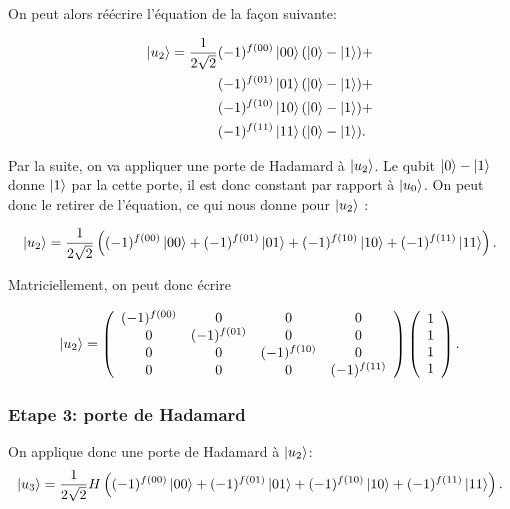 On peut alors réécrire l'équation de la façon suivante: 



\begin{align*}
  \ket{u_2} = \frac{1}{2\sqrt{2}} & (-1)^{f(00)} \ket{00}  (\ket{0} - \ket{1}) + \\
&(-1)^{f(01)} \ket{01}  (\ket{0} - \ket{1}) + \\
&(-1)^{f(10)} \ket{10}  (\ket{0} - \ket{1}) + \\
&(-1)^{f(11)} \ket{11}  (\ket{0} - \ket{1}) .
\end{align*}

Par la suite, on va appliquer une porte de Hadamard à $\ket{u_2}$. Le qubit $\ket{0} - \ket{1}$ donne $\ket{1}$ par la cette porte, il est donc constant par rapport à $\ket{u_0}$. On peut donc le retirer de l'équation, ce qui nous donne pour $\ket{u_2}$ :

\begin{equation}
  \label{eq:3}
\ket{u_2} = \frac{1}{2\sqrt{2}} \left( (-1)^{f(00)} \ket{00} + (-1)^{f(01)} \ket{01} + (-1)^{f(10)} \ket{10} + (-1)^{f(11)} \ket{11} \right). 
\end{equation}


Matriciellement, on peut donc écrire

\begin{equation}
  \label{eq:4}
\ket{u_2} = \left(  \begin{array}{cccc}
     (-1)^{f(00)}  &0 & 0 &0 \\
     0 & (-1)^{f(01)} & 0 &0 \\
     0 &0 & (-1)^{f(10)} &0 \\
     0 &0 & 0 & (-1)^{f(11)} \\
        \end{array}
      \right)
      \left(  \begin{array}{c}
                1 \\
                1 \\
                1 \\
                1 
              \end{array}
      \right).
\end{equation}


\subsubsection{Etape 3: porte de Hadamard}

On applique donc une porte de Hadamard à $\ket{u_2}$:
\begin{equation}
  \label{eq:5}
\ket{u_3} = \frac{1}{2\sqrt{2}} H \left( (-1)^{f(00)} \ket{00} + (-1)^{f(01)} \ket{01} + (-1)^{f(10)} \ket{10} + (-1)^{f(11)} \ket{11} \right) .
\end{equation}

